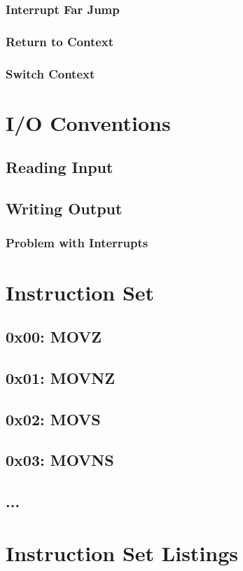 \documentclass[oneside, a4paper]{memoir}
\begin{document}
\subsection{Interrupt Far Jump}
\subsection{Return to Context}
\subsection{Switch Context}

\chapter{I/O Conventions}
\section{Reading Input}
\section{Writing Output}
\subsection{Problem with Interrupts}

\chapter{Instruction Set}
\section*{0x00: MOVZ}
\section*{0x01: MOVNZ}
\section*{0x02: MOVS}
\section*{0x03: MOVNS}
\section*{...}

\appendix
\chapter{Instruction Set Listings}
\end{document}
